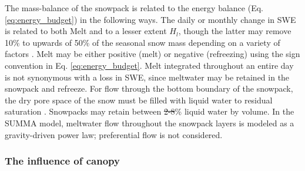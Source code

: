 \documentclass[draft]{agujournal2019}
\providecommand{\DIFadd}[1]{{\protect\color{blue}\uwave{#1}}} %
\providecommand{\DIFdel}[1]{{\protect\color{red}\sout{#1}}}                      %
\providecommand{\DIFaddbegin}{} %
\providecommand{\DIFaddend}{} %
\providecommand{\DIFdelbegin}{} %
\providecommand{\DIFdelend}{} %
\begin{document}
The mass-balance of the snowpack is related to the energy balance (Eq. \ref{eq:energy_budget}) in the following ways.
The daily or monthly change in SWE is related to both Melt and to a lesser extent $H_l$, though the latter may remove 10\% to upwards of 50\% of the seasonal snow mass depending on a variety of factors \cite{Sexstone2018-rc, Schwat2025-ur}.
Melt may be either positive (melt) or negative (refreezing) using the sign convention in Eq. \ref{eq:energy_budget}.
Melt integrated throughout an entire day is not synonymous with a loss in SWE, since meltwater may be retained in the snowpack and refreeze.
For flow through the bottom boundary of the snowpack, the dry pore space of the snow must be filled with liquid water to residual saturation \cite{Colbeck1976-xk, Seligman2014-kc}. Snowpacks may retain between \DIFdelbegin \DIFdel{2-8}\DIFdelend \DIFaddbegin \DIFadd{2--8}\DIFaddend \% liquid water by volume.
In the SUMMA model, meltwater flow throughout the snowpack layers is modeled as a gravity-driven power law; preferential flow is not considered.




\subsubsection{The influence of canopy}\label{sec:canopy_influence}
\end{document}
